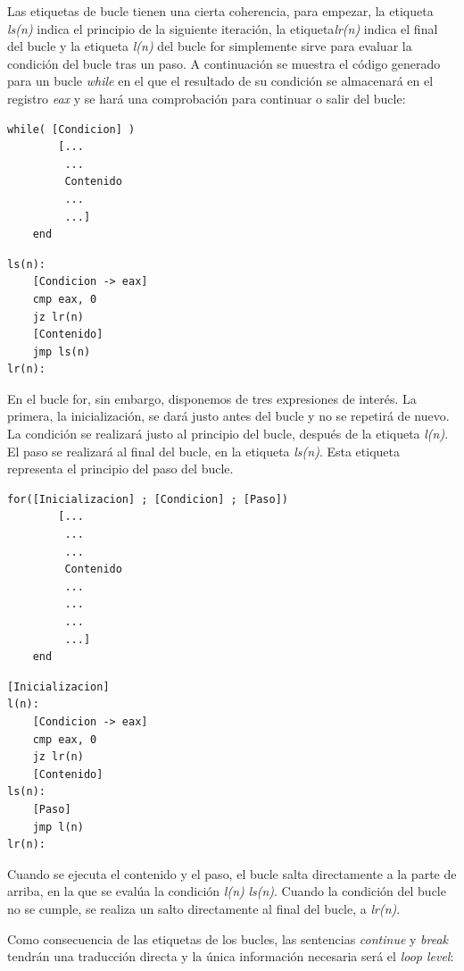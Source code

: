 \documentclass[a4paper,10pt]{article}
\begin{document}
Las etiquetas de bucle tienen una cierta coherencia, para empezar, la etiqueta \emph{ls(n)} indica el principio de la siguiente iteración, la etiqueta\emph{lr(n)} indica el final del bucle y la etiqueta \emph{l(n)} del bucle for simplemente sirve para evaluar la condición del bucle tras un paso. A continuación se muestra el código generado para un bucle \textit{while} en el que el resultado de su condición se almacenará en el registro \textit{eax} y se hará una comprobación para continuar o salir del bucle:

\begin{multicols}{2}
\begin{lstlisting}[language=jam,frame=single]
	while( [Condicion] )
		[...
		 ...
		 Contenido
		 ...
		 ...]
	end
\end{lstlisting}
\begin{lstlisting}[frame=single]
ls(n):
	[Condicion -> eax]
	cmp eax, 0
	jz lr(n)
	[Contenido]
	jmp ls(n)
lr(n):
\end{lstlisting}
\end{multicols}

En el bucle for, sin embargo, disponemos de tres expresiones de interés. La primera, la inicialización, se dará justo antes del bucle y no se repetirá de nuevo. La condición se realizará justo al principio del bucle, después de la etiqueta \emph{l(n)}. El paso se realizará al final del bucle, en la etiqueta \emph{ls(n)}. Esta etiqueta representa el principio del paso del bucle.
\begin{multicols}{2}
\begin{lstlisting}[language=jam,frame=single]
	for([Inicializacion] ; [Condicion] ; [Paso])
		[...
		 ...
		 ...
		 Contenido
		 ...
		 ...
		 ...
		 ...]
	end
\end{lstlisting}
\begin{lstlisting}[frame=single]
	[Inicializacion]
l(n):
	[Condicion -> eax]
	cmp eax, 0
	jz lr(n)
	[Contenido]
ls(n):
	[Paso]
	jmp l(n)
lr(n):
\end{lstlisting}
\end{multicols}

Cuando se ejecuta el contenido y el paso, el bucle salta directamente a la parte de arriba, en la que se evalúa la condición \emph{l(n)} \emph{ls(n)}. Cuando la condición del bucle no se cumple, se realiza un salto directamente al final del bucle, a \emph{lr(n)}.

Como consecuencia de las etiquetas de los bucles, las sentencias \textit{continue} y \textit{break} tendrán una traducción directa y la única información necesaria será el \textit{loop level}:
\end{document}
